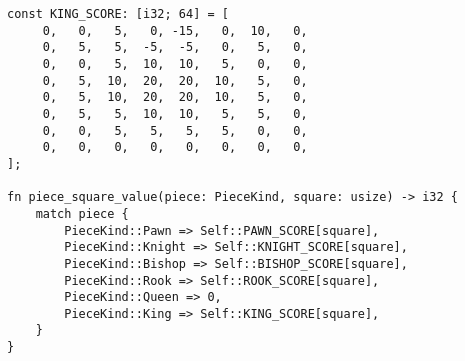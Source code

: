\begin{lstlisting}[language=RustHtml]
const KING_SCORE: [i32; 64] = [
     0,   0,   5,   0, -15,   0,  10,   0,
     0,   5,   5,  -5,  -5,   0,   5,   0,
     0,   0,   5,  10,  10,   5,   0,   0,
     0,   5,  10,  20,  20,  10,   5,   0,
     0,   5,  10,  20,  20,  10,   5,   0,
     0,   5,   5,  10,  10,   5,   5,   0,
     0,   0,   5,   5,   5,   5,   0,   0,
     0,   0,   0,   0,   0,   0,   0,   0,
];

fn piece_square_value(piece: PieceKind, square: usize) -> i32 {
    match piece {
        PieceKind::Pawn => Self::PAWN_SCORE[square],
        PieceKind::Knight => Self::KNIGHT_SCORE[square],
        PieceKind::Bishop => Self::BISHOP_SCORE[square],
        PieceKind::Rook => Self::ROOK_SCORE[square],
        PieceKind::Queen => 0,
        PieceKind::King => Self::KING_SCORE[square],
    }
}

\end{lstlisting}

